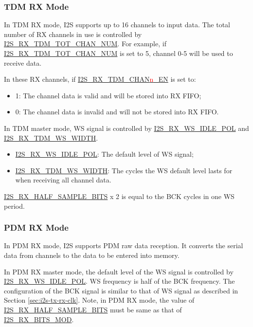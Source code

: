 \documentclass[main\_\_EN.tex]{subfiles}
\begin{document}
\subsubsection{TDM RX Mode}

In TDM RX mode, I2S supports up to 16 channels to input data. The total number of RX channels in use is controlled by \hyperref[fielddesc:I2SRXTDMTOTCHANNUM]{I2S\_RX\_TDM\_TOT\_CHAN\_NUM}. For example, if \hyperref[fielddesc:I2SRXTDMTOTCHANNUM]{I2S\_RX\_TDM\_TOT\_CHAN\_NUM} is set to 5, channel 0-5 will be used to receive data.

In these RX channels, if \hyperref[fielddesc:I2STXTDMCHAN0EN]{I2S\_RX\_TDM\_CHAN{\textcolor{red}{n}}\_EN} is set to:
\begin{itemize}
    \item 1: The channel data is valid and will be stored into RX FIFO;
    \item 0: The channel data is invalid and will not be stored into RX FIFO.
\end{itemize}
In TDM master mode, WS signal is controlled by \hyperref[fielddesc:I2SRXWSIDLEPOL]{I2S\_RX\_WS\_IDLE\_POL} and \hyperref[fielddesc:I2SRXTDMWSWIDTH]{I2S\_RX\_TDM\_WS\_WIDTH}.
\begin{itemize}
    \item \hyperref[fielddesc:I2SRXWSIDLEPOL]{I2S\_RX\_WS\_IDLE\_POL}: The default level of WS signal;
    \item \hyperref[fielddesc:I2SRXTDMWSWIDTH]{I2S\_RX\_TDM\_WS\_WIDTH}: The cycles the WS default level lasts for when receiving all channel data.
\end{itemize}

\hyperref[fielddesc:I2SRXHALFSAMPLEBITS]{I2S\_RX\_HALF\_SAMPLE\_BITS} x 2 is equal to the BCK cycles in one WS period.

\subsubsection{PDM RX Mode} 

In PDM RX mode, I2S supports PDM raw data reception. It converts the serial data from channels to the data to be entered into memory.

In PDM RX master mode, the default level of the WS signal is controlled by \hyperref[fielddesc:I2SRXWSIDLEPOL]{I2S\_RX\_WS\_IDLE\_POL}. WS frequency is half of the BCK frequency. The configuration of the BCK signal is similar to that of WS signal as described in Section \ref{sec:i2s-tx-rx-clk}. Note, in PDM RX mode, the value of \hyperref[fielddesc:I2SRXHALFSAMPLEBITS]{I2S\_RX\_HALF\_SAMPLE\_BITS} must be same as that of \hyperref[fielddesc:I2SRXBITSMOD]{I2S\_RX\_BITS\_MOD}.
\end{document}
